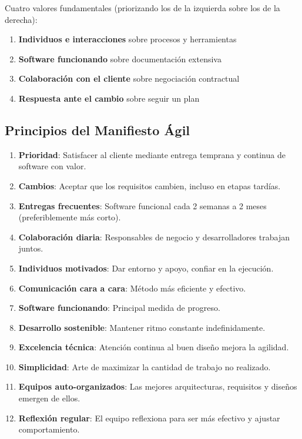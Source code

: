     Cuatro valores fundamentales (priorizando los de la izquierda sobre los de la derecha):

    \begin{enumerate}
        \item \textbf{Individuos e interacciones} sobre procesos y herramientas
        \item \textbf{Software funcionando} sobre documentación extensiva
        \item \textbf{Colaboración con el cliente} sobre negociación contractual
        \item \textbf{Respuesta ante el cambio} sobre seguir un plan
    \end{enumerate}

    \subsection{Principios del Manifiesto Ágil}\label{subsec:principios-del-manifiesto-agil}

    \begin{enumerate}
        \item \textbf{Prioridad}: Satisfacer al cliente mediante entrega temprana y continua de software con valor.
        \item \textbf{Cambios}: Aceptar que los requisitos cambien, incluso en etapas tardías.
        \item \textbf{Entregas frecuentes}: Software funcional cada 2 semanas a 2 meses (preferiblemente más corto).
        \item \textbf{Colaboración diaria}: Responsables de negocio y desarrolladores trabajan juntos.
        \item \textbf{Individuos motivados}: Dar entorno y apoyo, confiar en la ejecución.
        \item \textbf{Comunicación cara a cara}: Método más eficiente y efectivo.
        \item \textbf{Software funcionando}: Principal medida de progreso.
        \item \textbf{Desarrollo sostenible}: Mantener ritmo constante indefinidamente.
        \item \textbf{Excelencia técnica}: Atención continua al buen diseño mejora la agilidad.
        \item \textbf{Simplicidad}: Arte de maximizar la cantidad de trabajo no realizado.
        \item \textbf{Equipos auto-organizados}: Las mejores arquitecturas, requisitos y diseños emergen de ellos.
        \item \textbf{Reflexión regular}: El equipo reflexiona para ser más efectivo y ajustar comportamiento.
    \end{enumerate}


